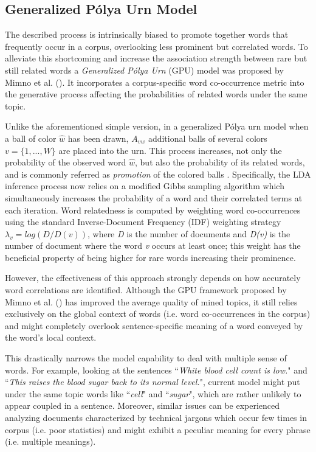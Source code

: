 \documentclass[letterpaper]{article}
\begin{document}
\subsection{Generalized P\'{o}lya Urn Model}
The described process is intrinsically biased to promote together words that frequently occur in a corpus, overlooking less prominent but correlated words. To alleviate this shortcoming and increase the association strength between rare but still related words a \textit{Generalized P\'{o}lya Urn} (GPU) model was proposed by  Mimno et al. (\citeyear{Mimno11}). It incorporates a corpus-specific word co-occurrence metric into the generative process affecting the probabilities of related words under the same topic.

Unlike the aforementioned simple version, in a generalized P\'{o}lya urn model when a ball of color $\hat{w}$ has been drawn, $A_{vw}$ additional balls of several colors $v=\{1,...,W\}$ are placed into the urn. This process increases, not only the probability of the observed word $\hat{w}$, but also the probability of its related words, and is commonly referred as \textit{promotion} of the colored balls \cite{Fei14}.
Specifically, the LDA inference process now relies on a modified Gibbs sampling algorithm which simultaneously increases the probability of a word and their correlated terms at each iteration. Word relatedness is computed by weighting word co-occurrences using the standard Inverse-Document Frequency (IDF) weighting strategy $\lambda_v = log(D/D(v))$, where \textit{D} is the number of documents and \textit{D(v)} is the number of document where the word \textit{v} occurs at least once; this weight has the beneficial property of being higher for rare words increasing their prominence. 

However, the effectiveness of this approach strongly depends on how accurately word correlations are identified.
Although the GPU framework proposed by  Mimno et al. (\citeyear{Mimno11}) has improved the average quality of mined topics, it still relies exclusively on the global context of words (i.e. word co-occurrences in the corpus) and might completely overlook sentence-specific meaning of a word conveyed by the word's local context.

This drastically narrows the model capability to deal with multiple sense of words. For example, looking at the sentences ``\emph{White blood cell count is low.}" and ``\emph{This raises the blood sugar back to its normal level.}", current model might put under the same topic words like ``\emph{cell}" and ``\emph{sugar}", which are rather unlikely to appear coupled in a sentence. Moreover, similar issues can be experienced analyzing documents characterized by technical jargons which occur few times in corpus (i.e. poor statistics) and might exhibit a peculiar meaning for every phrase (i.e. multiple meanings).
\end{document}
